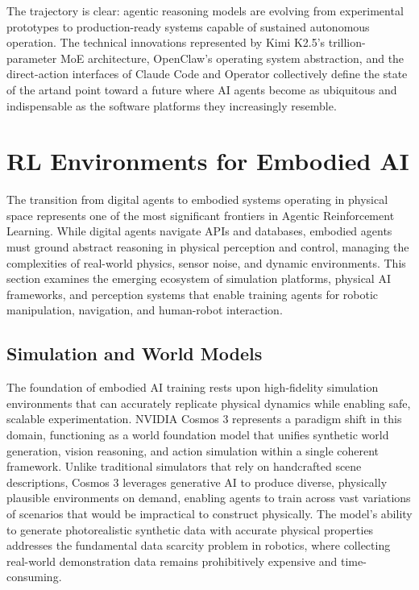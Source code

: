 The trajectory is clear: agentic reasoning models are evolving from experimental prototypes to production-ready systems capable of sustained autonomous operation. The technical innovations represented by Kimi K2.5's trillion-parameter MoE architecture, OpenClaw's operating system abstraction, and the direct-action interfaces of Claude Code and Operator collectively define the state of the artand point toward a future where AI agents become as ubiquitous and indispensable as the software platforms they increasingly resemble.
\section{RL Environments for Embodied AI}

The transition from digital agents to embodied systems operating in physical space represents one of the most significant frontiers in Agentic Reinforcement Learning. While digital agents navigate APIs and databases, embodied agents must ground abstract reasoning in physical perception and control, managing the complexities of real-world physics, sensor noise, and dynamic environments. This section examines the emerging ecosystem of simulation platforms, physical AI frameworks, and perception systems that enable training agents for robotic manipulation, navigation, and human-robot interaction.

\subsection{Simulation and World Models}

The foundation of embodied AI training rests upon high-fidelity simulation environments that can accurately replicate physical dynamics while enabling safe, scalable experimentation. NVIDIA Cosmos 3 represents a paradigm shift in this domain, functioning as a world foundation model that unifies synthetic world generation, vision reasoning, and action simulation within a single coherent framework. Unlike traditional simulators that rely on handcrafted scene descriptions, Cosmos 3 leverages generative AI to produce diverse, physically plausible environments on demand, enabling agents to train across vast variations of scenarios that would be impractical to construct physically. The model's ability to generate photorealistic synthetic data with accurate physical properties addresses the fundamental data scarcity problem in robotics, where collecting real-world demonstration data remains prohibitively expensive and time-consuming.

